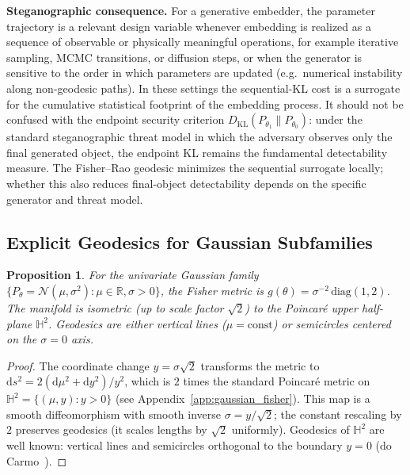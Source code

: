 \documentclass[a4paper,fleqn]{cas-dc}
\newtheorem{proposition}{Proposition}
\newcommand{\R}{\mathbb{R}}
\newcommand{\DKL}{D_{\mathrm{KL}}}
\begin{document}
\noindent\textbf{Steganographic consequence.}
For a generative embedder, the parameter trajectory is a relevant design
variable whenever embedding is realized as a sequence of observable or
physically meaningful operations, for example iterative sampling, MCMC
transitions, or diffusion steps, or when the generator is sensitive to the
order in which parameters are updated (e.g.\ numerical instability along
non-geodesic paths).  In these settings the sequential-KL cost is a surrogate
for the cumulative statistical footprint of the embedding process.  It should
not be confused with the endpoint security criterion
$\DKL(P_{\theta_1}\|P_{\theta_0})$: under the standard steganographic threat
model in which the adversary observes only the final generated object, the
endpoint KL remains the fundamental detectability measure.  The Fisher--Rao
geodesic minimizes the sequential surrogate locally; whether this also reduces
final-object detectability depends on the specific generator and threat model.

\subsection{Explicit Geodesics for Gaussian Subfamilies}

\begin{proposition}%
  \label{prop:gaussian_full_geodesic}
  For the univariate Gaussian family
  $\{P_\theta=\mathcal{N}(\mu,\sigma^2):\mu\in\R,\sigma>0\}$,
  the Fisher metric is
  $g(\theta) = \sigma^{-2}\,\mathrm{diag}(1, 2)$.
  The manifold is isometric (up to scale factor $\sqrt{2}$) to the
  Poincar\'{e} upper half-plane $\mathbb{H}^2$.
  Geodesics are either vertical lines ($\mu=\mathrm{const}$) or semicircles
  centered on the $\sigma=0$ axis.
\end{proposition}

\begin{proof}
  The coordinate change $y = \sigma\sqrt{2}$ transforms the metric to
  $\mathrm{d}s^2 = 2(\mathrm{d}\mu^2 + \mathrm{d}y^2)/y^2$, which is
  $2$ times the standard Poincar\'{e} metric on
  $\mathbb{H}^2 = \{(\mu,y): y>0\}$ (see Appendix~\ref{app:gaussian_fisher}).
  This map is a smooth diffeomorphism with smooth inverse
  $\sigma = y/\sqrt{2}$; the constant rescaling by $2$ preserves
  geodesics (it scales lengths by $\sqrt{2}$ uniformly).
  Geodesics of $\mathbb{H}^2$ are well known: vertical lines and
  semicircles orthogonal to the boundary $y=0$ (do Carmo~\cite{do2002riemannian}).
\end{proof}
\end{document}
